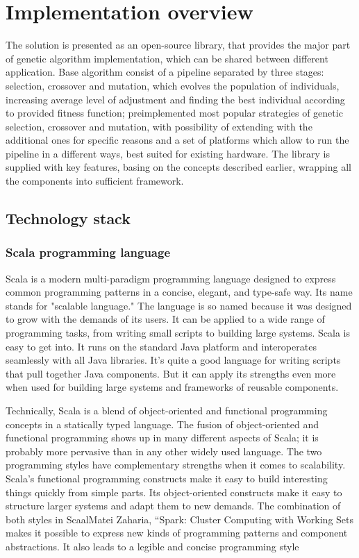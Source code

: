 \section{Implementation overview}

The solution is presented as an open-source library, that provides the major part of genetic algorithm implementation, which can be shared between different application. Base algorithm consist of a pipeline separated by three stages: selection, crossover and mutation, which evolves the population of individuals, increasing average level of adjustment and finding the best individual according to provided fitness function; preimplemented most popular strategies of genetic selection, crossover and mutation, with possibility of extending with the additional ones for specific reasons and a set of platforms which allow to run the pipeline in a different ways, best suited for existing hardware. The library is supplied with key features, basing on the concepts described earlier, wrapping all the components into sufficient framework.

\subsection{Technology stack}

\subsubsection{Scala programming language}

Scala is a modern multi-paradigm programming language designed to express common programming patterns in a concise, elegant, and type-safe way. Its name stands for "scalable language." The language is so named because it was designed to grow with the demands of its users. It can be applied to a wide range of programming tasks, from writing small scripts to building large systems.
Scala is easy to get into. It runs on the standard Java platform and interoperates seamlessly with all Java libraries. It's quite a good language for writing scripts that pull together Java components. But it can apply its strengths even more when used for building large systems and frameworks of reusable components. \cite{programming_in_scala}

Technically, Scala is a blend of object-oriented and functional programming concepts in a statically typed language. The fusion of object-oriented and functional programming shows up in many different aspects of Scala; it is probably more pervasive than in any other widely used language. The two programming styles have complementary strengths when it comes to scalability. Scala's functional programming constructs make it easy to build interesting things quickly from simple parts. Its object-oriented constructs make it easy to structure larger systems and adapt them to new demands. The combination of both styles in ScaalMatei Zaharia, “Spark: Cluster Computing with Working Sets
 makes it possible to express new kinds of programming patterns and component abstractions. It also leads to a legible and concise programming style \cite{programming_in_scala}

